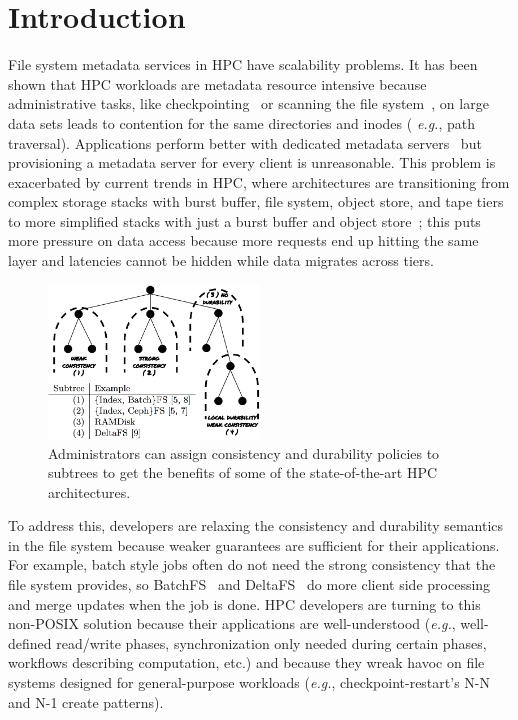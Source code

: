 \section{Introduction}

File system metadata services in HPC have scalability problems. It has been
shown that HPC workloads are metadata resource intensive because administrative
tasks, like checkpointing~\cite{bent_plfs_2009} or scanning the file
system~\cite{zheng:pdsw2014-batchfs}, on large data sets leads to contention
for the same directories and inodes ({\it
e.g.}, path traversal). Applications perform better with dedicated metadata
servers~\cite{sevilla:sc15-mantle, ren:sc2014-indexfs} but provisioning a
metadata server for every client is unreasonable. This problem is exacerbated
by current trends in HPC, where architectures are transitioning from complex
storage stacks with burst buffer, file system, object store, and tape tiers to
more simplified stacks with just a burst buffer and object
store~\cite{bent:login16-hpc-trends}; this puts more pressure on data access
because more requests end up hitting the same layer and latencies cannot be 
hidden while data migrates across tiers.

\begin{figure}[tb]
\centering
\includegraphics[width=0.5\textwidth]{figures/subtree-policies.png}
\caption{Administrators can assign consistency and durability policies to
subtrees to get the benefits of some of the state-of-the-art HPC architectures.
}\label{fig:subtree-policies}
\end{figure}


To address this, developers are relaxing the consistency and durability
semantics in the file system because weaker guarantees are sufficient for their
applications. For example, batch style jobs often do not need the strong
consistency that the file system provides, so
BatchFS~\cite{zheng:pdsw2014-batchfs} and DeltaFS~\cite{zheng:pdsw2015-deltafs}
do more client side processing and merge updates when the job is done. HPC
developers are turning to this non-POSIX solution because their applications
are well-understood ({\it e.g.}, well-defined read/write phases,
synchronization only needed during certain phases, workflows describing
computation, etc.) and because they wreak havoc on file systems designed for
general-purpose workloads ({\it e.g.}, checkpoint-restart's N-N and N-1 create
patterns).

